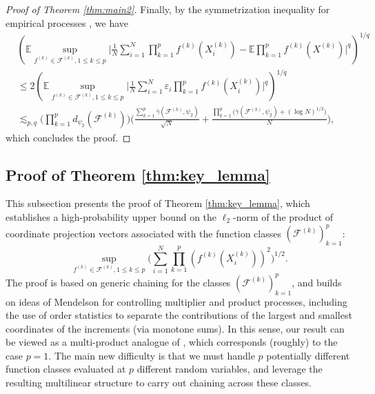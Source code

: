 \documentclass[numbers,webpdf,imaiai]{ima-authoring-template}
\theoremstyle{thmstyletwo}%
\numberwithin{equation}{section}
\numberwithin{equation}{section}
\newcommand{\F}{\mathcal{F}}
\newcommand{\E}{\mathbb{E}}
\begin{document}
\begin{proof}[Proof of Theorem \ref{thm:main2}]
Finally, by the symmetrization inequality for empirical processes \cite[Lemma 2.3.1]{van2023weak}, we have
\begin{align*}
&\left(\E \sup_{f^{(k)} \in \mathcal{F}^{(k)},1\le k\le p}\bigg|\frac{1}{N} \sum_{i=1}^N \prod_{k=1}^p f^{(k)} (X^{(k)}_i)-\mathbb{E} \prod_{k=1}^p f^{(k)} (X^{(k)})\bigg|^q\right)^{1/q} \\
&\le 2 \left(\E \sup_{f^{(k)}\in \F^{(k)},1\le k\le p} \bigg|\frac{1}{N}\sum_{i=1}^{N}\varepsilon_i \prod_{k=1}^{p} f^{(k)} (X^{(k)}_i) \bigg|^q\right)^{1/q} \\
&\lesssim_{p,q} \bigg(\prod_{k=1}^{p} d_{\psi_2}(\F^{(k)})\bigg)\bigg(\frac{\sum_{k=1}^{p}\bar{\gamma}(\F^{(k)},\psi_2)}{\sqrt{N}}+\frac{\prod_{k=1}^{p}\big(\bar{\gamma}(\F^{(k)},\psi_2)+(\log N)^{1/2}\big)}{N}\bigg),
\end{align*}
which concludes the proof.

\end{proof}







\subsection{Proof of Theorem \ref{thm:key_lemma}}\label{subsec:prooflemma}


This subsection presents the proof of Theorem \ref{thm:key_lemma}, which establishes a high-probability upper bound on the $\ell_{2}$-norm of the product of coordinate projection vectors associated with the function classes $(\F^{(k)})_{k=1}^{p}$:
\[
\sup_{f^{(k)}\in \F^{(k)},1\le k\le p} \bigg(\sum_{i=1}^{N}\prod_{k=1}^{p} \left(f^{(k)}(X_i^{(k)})\right)^2\bigg)^{1/2}.
\]
The proof is based on generic chaining for the classes $(\F^{(k)})_{k=1}^{p}$, and builds on ideas of Mendelson \cite{mendelson2016upper} for controlling multiplier and product processes, including the use of order statistics to separate the contributions of the largest and smallest coordinates of the increments (via monotone sums). In this sense, our result can be viewed as a multi-product analogue of \cite[Lemma 2.3]{mendelson2016upper}, which corresponds (roughly) to the case $p=1$. The main new difficulty is that we must handle $p$ potentially different function classes evaluated at $p$ different random variables, and leverage the resulting multilinear structure to carry out chaining across these classes. 
\end{document}

